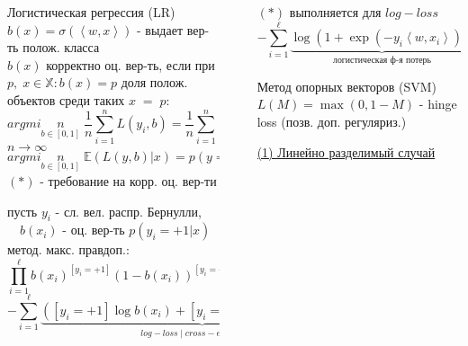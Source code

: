 \documentclass[final]{beamer}
\newlength{\sepwidth}
\newlength{\colwidth}
\newcommand{\separatorcolumn}{\begin{column}{\sepwidth}\end{column}}
\begin{document}
\begin{frame}[t]
\begin{columns}[t]
\begin{column}{\colwidth}
\begin{block}{Логистическая регрессия (LR)}
$b(x) = \sigma (\left<w, x\right>)$ - {\small выдает вер-ть полож. класса }\\
$b(x)$ {\small корректно оц. вер-ть, если при } $p, \;  x \in \mathbb{X} : b(x) = p$ {\small доля полож. объектов среди таких } $x \; = \; p$:
\[argmin\limits_{b \in [0, 1]} \; \frac{1}{n} \sum\limits_{i = 1}^n L(y_i, b) = \frac{1}{n} \sum\limits_{i = 1}^n [y_i = +1]\]
$n \to \infty$
\[argmin\limits_{b \in [0,1]} \; \mathbb{E} (L(y, b) | x) = p(y = +1 | x) \quad \forall x \in \mathbb{X} \; (*)\]
$(*)$ - {\small требование на корр. оц. вер-ти}

{\small пусть } $y_i$ - {\small сл. вел. распр. Бернулли,} $\quad b(x_i)$ - {\small оц. вер-ть } $p(y_i = +1| x)$\\
{\small метод. макс. правдоп.:}
\[\prod\limits_{i = 1}^{\ell} b(x_i)^{[y_i = +1]} (1 - b(x_i))^{[y_i = -1]} \to \max\limits_{b}\]
\[ -\sum\limits_{i = 1}^{\ell} \underbrace{\left([y_i = +1] \log b(x_i) + [y_i = -1] \log (1 - b(x_i))\right)}_{log-loss \; | \; cross-entropy \; loss} \to \min\limits_{b}\]
\end{block}
\end{column}

\separatorcolumn

\begin{column}{\colwidth}
$(*)$ {\small выполняется для } $log-loss$
\[-\sum\limits_{i = 1}^{\ell} \underbrace{\log\left(1 + \exp (-y_i \left<w, x_i\right>)\right)}_{\text{логистическая ф-я потерь}} \to \min\limits_{w}\]
\begin{block}{Метод опорных векторов (SVM)}
$L(M) = \max(0, 1 - M)$ - {\small hinge loss (позв. доп. регуляриз.)}

\underline{{\small (1) Линейно разделимый случай}}


\end{block}
\end{column}
\end{columns}
\end{frame}
\end{document}
